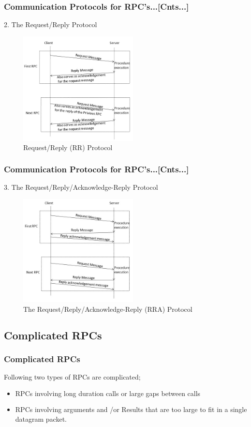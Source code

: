 \documentclass{beamer}
\begin{document}
\begin{frame}
	\frametitle{Communication Protocols for RPC's...[Cnts...]}
	\vspace{0.3cm}
	2. The Request/Reply Protocol
	\begin{figure}
		\centering
		\includegraphics[width=6cm]{fig48.jpg}
		\caption{Request/Reply (RR) Protocol}
	\end{figure}
\end{frame}


\begin{frame}
	\frametitle{Communication Protocols for RPC's...[Cnts...]}
	\vspace{0.3cm}
	3. The Request/Reply/Acknowledge-Reply Protocol
	\begin{figure}
		\centering
		\includegraphics[width=6cm]{fig49.jpg}
		\caption{The Request/Reply/Acknowledge-Reply (RRA) Protocol}
	\end{figure}
\end{frame}


\subsection{Complicated RPCs}
\begin{frame}
	\frametitle{Complicated RPCs}
	Following two types of RPCs are complicated;
	\vspace{0.5cm}
	\begin{itemize}
		\item RPCs involving long duration calls or large gaps between calls
		\item RPCs involving arguments and /or Results that are too large to fit in a 
		single datagram packet.
	\end{itemize}
	\vspace{3cm}
\end{frame}
\end{document}

